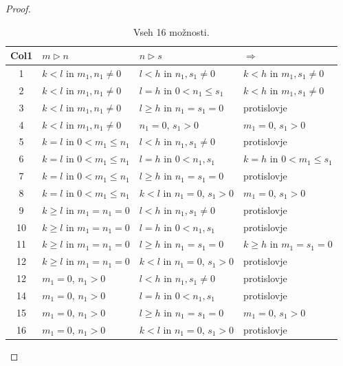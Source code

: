 \documentclass[mat2]{fmfdelo}
\begin{document}
\begin{proof}
\begin{table}[h!]
\centering
\begin{tabular}{||c | l | l | l||} 
 \hline
 Col1 & $m \triangleright n$ & $n \triangleright s$ & $\Rightarrow$ \\ [0.5ex] 
 \hline\hline
 1 & $k<l$ in $m_1, n_1 \neq 0$ & $l<h$ in $n_1, s_1 \neq 0$ & $k<h$ in $m_1, s_1 \neq 0$ \\ 
 2 & $k<l$ in $m_1, n_1 \neq 0$ & $l=h$ in $0<n_1 \leq s_1$ & $k<h$ in $m_1, s_1 \neq 0$ \\
 3 & $k<l$ in $m_1, n_1 \neq 0$ & $l \geq h$ in $n_1 = s_1 = 0$ & protislovje \\
 4 & $k<l$ in $m_1, n_1 \neq 0$ & $n_1 = 0$, $s_1 > 0$ & $m_1 = 0$, $s_1 > 0$ \\
 5 & $k=l$ in $0<m_1 \leq n_1$ & $l<h$ in $n_1, s_1 \neq 0$ & protislovje \\ 
 6 & $k=l$ in $0<m_1 \leq n_1$ & $l=h$ in $0<n_1, s_1$ & $k=h$ in $0<m_1 \leq s_1$ \\
 7 & $k=l$ in $0<m_1 \leq n_1$ & $l \geq h$ in $n_1 = s_1 = 0$ & protislovje \\
 8 & $k=l$ in $0<m_1 \leq n_1$ & $k<l$ in $n_1 = 0$, $s_1 > 0$ & $m_1 = 0$, $s_1 > 0$ \\
 9 & $k \geq l$ in $m_1 = n_1 = 0$ & $l<h$ in $n_1, s_1 \neq 0$ & protislovje \\ 
 10 & $k \geq l$ in $m_1 = n_1 = 0$ & $l=h$ in $0<n_1, s_1$ & protislovje \\
 11 & $k \geq l$ in $m_1 = n_1 = 0$ & $l \geq h$ in $n_1 = s_1 = 0$ & $k \geq h$ in $m_1 = s_1 = 0$ \\
 12 & $k \geq l$ in $m_1 = n_1 = 0$ & $k<l$ in $n_1 = 0$, $s_1 > 0$ & protislovje \\
 12 & $m_1 = 0$, $n_1 > 0$ & $l<h$ in $n_1, s_1 \neq 0$ & protislovje \\ 
 14 & $m_1 = 0$, $n_1 > 0$ & $l=h$ in $0<n_1, s_1$ & protislovje \\
 15 & $m_1 = 0$, $n_1 > 0$ & $l \geq h$ in $n_1 = s_1 = 0$ & $m_1 = 0$, $s_1 > 0$ \\
 16 & $m_1 = 0$, $n_1 > 0$ & $k<l$ in $n_1 = 0$, $s_1 > 0$ & protislovje \\[1ex] 
 \hline
\end{tabular}
\caption{Vseh 16 možnosti.}
\label{table:1}
\end{table}


\end{proof}
\end{document}
